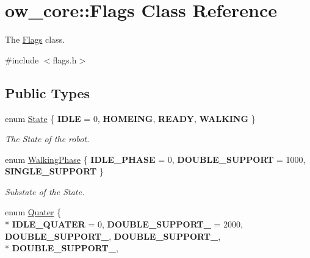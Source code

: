 \hypertarget{classow__core_1_1Flags}{}\section{ow\+\_\+core\+:\+:Flags Class Reference}
\label{classow__core_1_1Flags}


The \hyperlink{classow__core_1_1Flags}{Flags} class.  




{\ttfamily \#include $<$flags.\+h$>$}

\subsection*{Public Types}
\begin{DoxyCompactItemize}
\item 
enum \hyperlink{classow__core_1_1Flags_a836dbca91193b9980b6b1246223c55ab}{State} \{ {\bfseries I\+D\+LE} = 0, 
{\bfseries H\+O\+M\+E\+I\+NG}, 
{\bfseries R\+E\+A\+DY}, 
{\bfseries W\+A\+L\+K\+I\+NG}
 \}\hypertarget{classow__core_1_1Flags_a836dbca91193b9980b6b1246223c55ab}{}\label{classow__core_1_1Flags_a836dbca91193b9980b6b1246223c55ab}
\begin{DoxyCompactList}\small\item\em The State of the robot. \end{DoxyCompactList}
\item 
enum \hyperlink{classow__core_1_1Flags_a236f38ae9e43be7da3b784c8b72aaf44}{Walking\+Phase} \{ {\bfseries I\+D\+L\+E\+\_\+\+P\+H\+A\+SE} = 0, 
{\bfseries D\+O\+U\+B\+L\+E\+\_\+\+S\+U\+P\+P\+O\+RT} = 1000, 
{\bfseries S\+I\+N\+G\+L\+E\+\_\+\+S\+U\+P\+P\+O\+RT}
 \}\hypertarget{classow__core_1_1Flags_a236f38ae9e43be7da3b784c8b72aaf44}{}\label{classow__core_1_1Flags_a236f38ae9e43be7da3b784c8b72aaf44}
\begin{DoxyCompactList}\small\item\em Substate of the State. \end{DoxyCompactList}
\item 
enum \hyperlink{classow__core_1_1Flags_a0d23fb94c71bd93061b7f966a9cd99fe}{Quater} \{ \\*
{\bfseries I\+D\+L\+E\+\_\+\+Q\+U\+A\+T\+ER} = 0, 
{\bfseries D\+O\+U\+B\+L\+E\+\_\+\+S\+U\+P\+P\+O\+R\+T\+\_} = 2000, 
{\bfseries D\+O\+U\+B\+L\+E\+\_\+\+S\+U\+P\+P\+O\+R\+T\+\_}, 
{\bfseries D\+O\+U\+B\+L\+E\+\_\+\+S\+U\+P\+P\+O\+R\+T\+\_}, 
\\*
{\bfseries D\+O\+U\+B\+L\+E\+\_\+\+S\+U\+P\+P\+O\+R\+T\+\_}, 

\end{DoxyCompactItemize}
